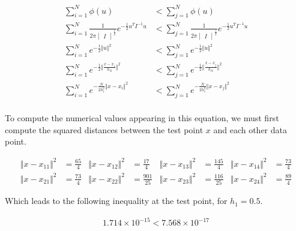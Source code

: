 \documentclass[a4paper, 10pt, twoside]{article}
\begin{document}
\begin{enumerate}[a)]
          \begin{align*}
              \sum_{i=1}^N \phi(u)                                                                              & < \sum_{j=1}^N \phi(u)                                                                              \\
              \sum_{i=1}^N \frac{1}{2 \pi \begin{vmatrix}I\end{vmatrix}^\frac{1}{2}} e^{-\frac{1}{2} u^T I^{-1} u} & < \sum_{j=1}^N \frac{1}{2 \pi \begin{vmatrix}I\end{vmatrix}^\frac{1}{2}} e^{-\frac{1}{2} u^T I^{-1} u} \\
              \sum_{i=1}^N e^{-\frac{1}{2} \Vert u \Vert^2}                                                     & < \sum_{j=1}^N e^{-\frac{1}{2} \Vert u \Vert^2}                                                     \\
              \sum_{i=1}^N e^{-\frac{1}{2} \Vert \frac{x - x_i}{h_N} \Vert^2}                                   & < \sum_{j=1}^N e^{-\frac{1}{2} \Vert  \frac{x - x_j}{h_N} \Vert^2}                                  \\
              \sum_{i=1}^N e^{-\frac{N}{2h_1^2} \Vert x - x_i \Vert^2}                                          & < \sum_{j=1}^N e^{-\frac{N}{2h_1^2} \Vert x - x_j \Vert^2}                                          \\
          \end{align*}

          To compute the numerical values appearing in this equation, we must first compute the squared distances between the test point $x$ and each other data point.

          \begin{align*}
              \Vert x - x_{11} \Vert^2 & = \frac{65}{4} & \Vert x - x_{12} \Vert^2 & = \frac{17}{4}   & \Vert x - x_{13} \Vert^2 & = \frac{145}{4}  & \Vert x - x_{14} \Vert^2 & = \frac{73}{4} \\
              \Vert x - x_{21} \Vert^2 & = \frac{73}{4} & \Vert x - x_{22} \Vert^2 & = \frac{901}{25} & \Vert x - x_{23} \Vert^2 & = \frac{116}{25} & \Vert x - x_{24} \Vert^2 & = \frac{89}{4}
          \end{align*}

          Which leads to the following inequality at the test point, for $h_1 = 0.5$.

          \begin{align*}
              1.714 \times 10^{-15} < 7.568 \times 10^{-17}
          \end{align*}


\end{enumerate}
\end{document}

